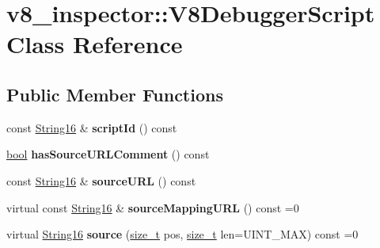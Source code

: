 \hypertarget{classv8__inspector_1_1V8DebuggerScript}{}\section{v8\+\_\+inspector\+:\+:V8\+Debugger\+Script Class Reference}
\label{classv8__inspector_1_1V8DebuggerScript}
\subsection*{Public Member Functions}
\begin{DoxyCompactItemize}
\item 
\mbox{\label{classv8__inspector_1_1V8DebuggerScript_a749cf00fb04978121f2da79311d57c2e}} 
const \mbox{\hyperlink{classv8__inspector_1_1String16}{String16}} \& {\bfseries script\+Id} () const
\item 
\mbox{\label{classv8__inspector_1_1V8DebuggerScript_acf7b5f671588e4a28f745e95f4b6519a}} 
\mbox{\hyperlink{classbool}{bool}} {\bfseries has\+Source\+U\+R\+L\+Comment} () const
\item 
\mbox{\label{classv8__inspector_1_1V8DebuggerScript_a80232143b069dcbf96e253fe2d1bfc69}} 
const \mbox{\hyperlink{classv8__inspector_1_1String16}{String16}} \& {\bfseries source\+U\+RL} () const
\item 
\mbox{\label{classv8__inspector_1_1V8DebuggerScript_a159d6eeda554f6761c90394b785d3bf8}} 
virtual const \mbox{\hyperlink{classv8__inspector_1_1String16}{String16}} \& {\bfseries source\+Mapping\+U\+RL} () const =0
\item 
\mbox{\label{classv8__inspector_1_1V8DebuggerScript_a11228de74c6fa248e06649526cdf3961}} 
virtual \mbox{\hyperlink{classv8__inspector_1_1String16}{String16}} {\bfseries source} (\mbox{\hyperlink{classsize__t}{size\+\_\+t}} pos, \mbox{\hyperlink{classsize__t}{size\+\_\+t}} len=U\+I\+N\+T\+\_\+\+M\+AX) const =0
\item 
\mbox{\label{classv8__inspector_1_1V8DebuggerScript_a539b9f8217c004171132102bffb58027}} 

\end{DoxyCompactItemize}
